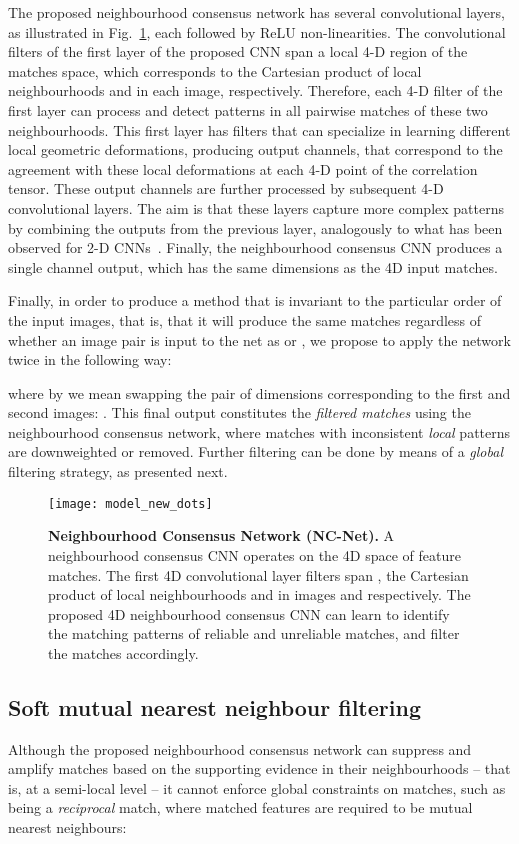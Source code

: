 \documentclass{article}
\begin{document}
 The proposed neighbourhood consensus network has several convolutional layers, as illustrated in Fig.~\ref{fig:model}, each followed by ReLU non-linearities. The convolutional filters of the first layer of the proposed CNN span a local 4-D region of the matches space, which corresponds to the Cartesian product of local neighbourhoods  and  in each image, respectively. Therefore, each 4-D filter of the first layer can process and detect patterns in all pairwise matches of these two neighbourhoods. This first layer has  filters that can specialize in learning different local geometric deformations, producing  output channels, that correspond to the agreement with these local deformations at each 4-D point of the correlation tensor. 
 These output channels are further processed by subsequent 4-D convolutional layers. The aim is that these layers capture more complex patterns by combining the outputs from the previous layer, analogously to what has been observed for 2-D CNNs~\cite{zeiler2014visualizing}.
 Finally, the neighbourhood consensus CNN produces a single channel output, which has the same dimensions as the 4D input matches.
 
Finally, in order to produce a method that is invariant to the particular order of the input images, that is, that it will produce the same matches regardless of whether an image pair is input to the net as  or , we propose to apply the network twice in the following way:

where by  we mean swapping the pair of dimensions corresponding to the first and second images: .
This final output constitutes the \emph{filtered matches}  using the neighbourhood consensus network, where matches with inconsistent \emph{local} patterns are downweighted or removed. Further filtering can be done by means of a  \emph{global} filtering strategy, as presented next.

\begin{figure}[t]
  \centering
    \texttt{[image: model\_new\_dots]}
    \caption{\small \textbf{Neighbourhood Consensus Network (NC-Net).} A neighbourhood consensus CNN operates on the 4D space of feature matches. The first 4D convolutional layer filters
    span , the Cartesian product of local neighbourhoods  and  in images  and  respectively. The proposed 4D neighbourhood consensus CNN can learn to identify the matching patterns of reliable and unreliable matches, and filter the matches accordingly.\label{fig:model}}
\end{figure}
\subsection{Soft mutual nearest neighbour filtering}
Although the proposed neighbourhood consensus network can suppress and amplify matches based on the supporting evidence in their neighbourhoods -- that is, at a semi-local level -- it cannot enforce global constraints on matches, such as being a \emph{reciprocal} match, where matched features are required to be mutual nearest neighbours:
\end{document}
